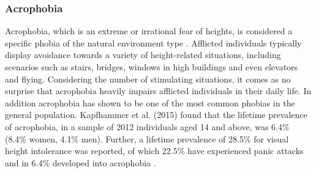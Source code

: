\subsubsection{Acrophobia}
Acrophobia, which is an extreme or irrational fear of heights, is considered a specific phobia of the natural environment type \cite{DSMIV1994}. Afflicted individuals typically display avoidance towards a variety of height-related situations, including scenarios such as stairs, bridges, windows in high buildings and even elevators and flying. Considering the number of stimulating situations, it comes as no surprise that acrophobia heavily impairs afflicted individuals in their daily life. In addition acrophobia has shown to be one of the most common phobias in the general population. Kapfhammer et al. (2015) found that the lifetime prevalence of acrophobia, in a sample of 2012 individuals aged 14 and above, was 6.4\% (8.4\% women, 4.1\% men). Further, a lifetime prevalence of 28.5\% for visual height intolerance was reported, of which 22.5\% have experienced panic attacks and in 6.4\% developed into acrophobia \cite{Kapfhammer2015}. 





